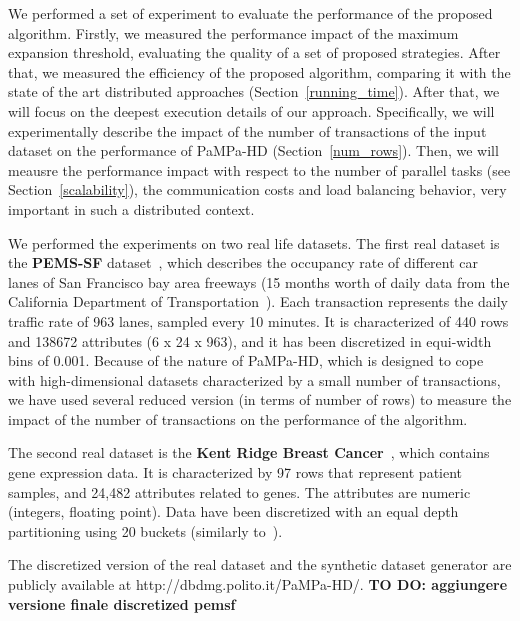 We performed a set of experiment to evaluate the performance of the proposed algorithm. Firstly, we measured the performance impact of the maximum expansion threshold, evaluating the quality of a set of proposed strategies. After that, we measured the efficiency of the proposed algorithm,
comparing it with the state of the art distributed approaches (Section~\ref{running_time}). After that, we will focus on the deepest execution details of our approach. Specifically, we will experimentally describe the impact of the number of transactions of the input dataset on the performance of PaMPa-HD (Section~\ref{num_rows}). Then, we will meausre the performance impact with respect to  the number of parallel tasks (see Section~\ref{scalability}), the communication costs and load balancing behavior,
very important in such a distributed context.

We performed the experiments on two real life datasets.
The first real dataset is the \textbf{PEMS-SF} dataset~\cite{uci}, 
which describes the occupancy rate of different car lanes of San Francisco bay area freeways (15 months worth of daily data from the California Department of Transportation~\cite{pems}).
Each transaction represents the daily traffic rate of 963 lanes, sampled every 10 minutes.
It is characterized of 440 rows and 138672 attributes (6 x 24 x 963), and it has been discretized in
equi-width bins of 0.001.
Because of the nature of PaMPa-HD, which is designed to cope with high-dimensional datasets characterized by a small number of transactions, we have used several reduced version (in terms of number of rows) to measure the impact of the number of transactions on the performance of the algorithm.

The second real dataset is the \textbf{Kent Ridge Breast Cancer}~\cite{breast_cancer_dataset}, which contains gene expression data.
It is characterized by 97 rows that represent patient samples, and
24,482 attributes related to genes. The attributes are numeric (integers, floating point).
Data have been discretized with an equal depth partitioning
using 20 buckets (similarly to~\cite{Zaki_Carpenter}).

The discretized version of the real dataset and the synthetic dataset generator
are publicly available at http://dbdmg.polito.it/PaMPa-HD/. \textbf{TO DO: aggiungere versione finale discretized pemsf}



